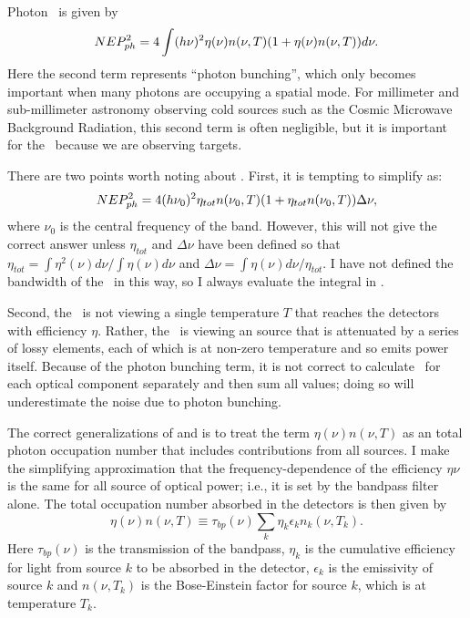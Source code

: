 Photon \NEP\ is given by \cite[Equation~51]{zmuidzinas_thermal_2003}
\begin{equation} \label{eqn:ch4-photon-nep}
  NEP_{ph}^2 = 4 \int (h \nu)^2 \eta(\nu) n(\nu,T) (1 + \eta(\nu) n(\nu,T)) d \nu.
\end{equation}
Here the second term represents ``photon bunching'', which only becomes important when many photons are occupying a spatial mode.
For millimeter and sub-millimeter astronomy observing cold sources such as the Cosmic Microwave Background Radiation, this second term is often negligible, but it is important for the \Imager\ because we are observing  targets.

There are two points worth noting about .
First, it is tempting to simplify  as:
\begin{equation}
  NEP_{ph}^2 = 4 (h \nu_0)^2 \eta_{tot} n(\nu_0,T) (1 + \eta_{tot} n(\nu_0,T)) \Delta \nu,
\end{equation}
where $\nu_0$ is the central frequency of the band.
However, this will not give the correct answer unless $\eta_{tot}$ and $\Delta \nu$ have been defined so that $\eta_{tot} = \int \eta^2(\nu) d\nu / \int \eta(\nu) d\nu$ and $\Delta \nu = \int \eta(\nu) d \nu / \eta_{tot}$.
I have not defined the bandwidth of the \Imager\ in this way, so I always evaluate the integral in .

Second, the \Imager\ is not viewing a single temperature $T$ that reaches the detectors with efficiency $\eta$.
Rather, the \Imager\ is viewing an  source that is attenuated by a series of lossy elements, each of which is at non-zero temperature and so emits power itself.
Because of the photon bunching term, it is not correct to calculate \NEPph\ for each optical component separately and then sum all values; doing so will underestimate the noise due to photon bunching.

The correct generalizations of  and  is to treat the term $\eta(\nu) n(\nu,T)$ as an total photon occupation number that includes contributions from all sources.
I make the simplifying approximation that the frequency-dependence of the efficiency $\eta{\nu}$ is the same for all source of optical power; i.e., it is set by the bandpass filter alone.
The total occupation number absorbed in the detectors is then given by
\begin{equation} \label{eqn:ch4-tot-n0}
  \eta(\nu) n(\nu,T) \equiv \tau_{bp}(\nu) \sum_k \eta_k \epsilon_k n_k(\nu,T_k).
\end{equation}
Here $\tau_{bp}(\nu)$ is the transmission of the bandpass, $\eta_k$ is the cumulative efficiency for light from source $k$ to be absorbed in the detector, $\epsilon_k$ is the emissivity of source $k$ and $n(\nu,T_k)$ is the Bose-Einstein factor  for source $k$, which is at temperature $T_k$.

